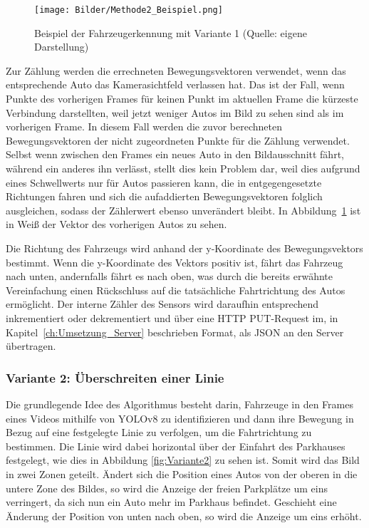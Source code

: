 \begin{figure}[h]
	\myImagePos{}
	\texttt{[image: Bilder/Methode2\_Beispiel.png]}
	\caption[Fahrzeugerkennung Variante 1 Beispiel]{Beispiel der Fahrzeugerkennung mit Variante 1 (Quelle: eigene Darstellung)}
	\label{fig:Variante1}
\end{figure}

Zur Zählung werden die errechneten Bewegungsvektoren verwendet, wenn das entsprechende Auto das Kamerasichtfeld verlassen hat.
Das ist der Fall, wenn Punkte des vorherigen Frames für keinen Punkt im aktuellen Frame die kürzeste Verbindung darstellten, weil jetzt weniger Autos im Bild zu sehen sind als im vorherigen Frame.
In diesem Fall werden die zuvor berechneten Bewegungsvektoren der nicht zugeordneten Punkte für die Zählung verwendet.
Selbst wenn zwischen den Frames ein neues Auto in den Bildausschnitt fährt, während ein anderes ihn verlässt, stellt dies kein Problem dar, weil dies aufgrund eines Schwellwerts nur für Autos passieren kann, die in entgegengesetzte Richtungen fahren und sich die aufaddierten Bewegungsvektoren folglich ausgleichen, sodass der Zählerwert ebenso unverändert bleibt.
In Abbildung~\ref{fig:Variante1} ist in Weiß der Vektor des vorherigen Autos zu sehen.

Die Richtung des Fahrzeugs wird anhand der y-Koordinate des Bewegungsvektors bestimmt.
Wenn die y-Koordinate des Vektors positiv ist, fährt das Fahrzeug nach unten, andernfalls fährt es nach oben, was durch die bereits erwähnte Vereinfachung einen Rückschluss auf die tatsächliche Fahrtrichtung des Autos ermöglicht.
Der interne Zähler des Sensors wird daraufhin entsprechend inkrementiert oder dekrementiert und über eine HTTP PUT-Request im, in Kapitel~\ref{ch:Umsetzung_Server} beschrieben Format, als JSON an den Server übertragen.

\subsubsection{Variante 2: Überschreiten einer Linie}\label{ch:Sensor_v2}

Die grundlegende Idee des Algorithmus besteht darin, Fahrzeuge in den Frames eines Videos mithilfe von YOLOv8 zu identifizieren und dann ihre Bewegung in Bezug auf eine festgelegte Linie zu verfolgen, um die Fahrtrichtung zu bestimmen.
Die Linie wird dabei horizontal über der Einfahrt des Parkhauses festgelegt, wie dies in Abbildung \ref{fig:Variante2} zu sehen ist.
Somit wird das Bild in zwei Zonen geteilt.
Ändert sich die Position eines Autos von der oberen in die untere Zone des Bildes, so wird die Anzeige der freien Parkplätze um eins verringert, da sich nun ein Auto mehr im Parkhaus befindet.
Geschieht eine Änderung der Position von unten nach oben, so wird die Anzeige um eins erhöht.

